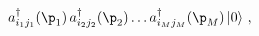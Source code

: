 \begin{equation}
    a^\dagger_{i_1 j_1}(\p_1) \,
    a^\dagger_{i_2 j_2}(\p_2) \dots
    a^\dagger_{i_M j_M}(\p_M) \,|0\rangle \ ,
\end{equation}

